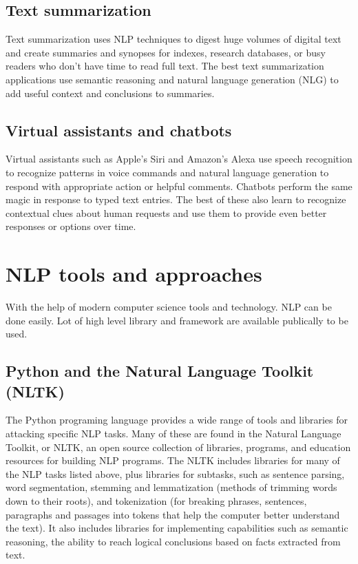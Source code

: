 \documentclass[11pt]{article}
\begin{document}
\subsection{Text summarization}
\label{sec:orgac3d698}
Text summarization uses NLP techniques to digest huge volumes of digital text and
create summaries and synopses for indexes, research databases, or busy readers who
don't have time to read full text. The best text summarization applications use
semantic reasoning and natural language generation (NLG) to add useful context
and conclusions to summaries.

\subsection{Virtual assistants and chatbots}
\label{sec:org6325ece}
Virtual assistants such as Apple's Siri and Amazon's Alexa use speech recognition
to recognize patterns in voice commands and natural language generation to respond
with appropriate action or helpful comments. Chatbots perform the same magic in
response to typed text entries. The best of these also learn to recognize contextual
clues about human requests and use them to provide even better responses or options
over time. 
\clearpage

\section{NLP tools and approaches}
\label{sec:orge999d84}
With the help of modern computer science tools and technology. NLP can be done easily.
Lot of high level library and framework are available publically to be used.

\subsection{Python and the Natural Language Toolkit (NLTK)}
\label{sec:orgb122cf7}
The Python programing language provides a wide range of tools and libraries
for attacking specific NLP tasks. Many of these are found in the Natural Language
Toolkit, or NLTK, an open source collection of libraries, programs, and
education resources for building NLP programs.
The NLTK includes libraries for many of the NLP tasks listed above, plus libraries
for subtasks, such as sentence parsing, word segmentation, stemming and
lemmatization (methods of trimming words down to their roots), and tokenization
(for breaking phrases, sentences, paragraphs and passages into tokens that help
the computer better understand the text). It also includes libraries for implementing
capabilities such as semantic reasoning, the ability to reach logical conclusions
based on facts extracted from text.
\end{document}
